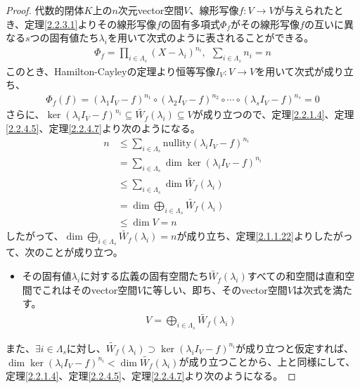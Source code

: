 \documentclass[dvipdfmx]{jsarticle}
\begin{document}
\begin{proof}
代数的閉体$K$上の$n$次元vector空間$V$、線形写像$f:V \rightarrow V$が与えられたとき、定理\ref{2.2.3.1}よりその線形写像$f$の固有多項式$\varPhi_{f}$がその線形写像$f$の互いに異なる$s$つの固有値たち$\lambda_{i}$を用いて次式のように表されることができる。
\begin{align*}
\varPhi_{f} = \prod_{i \in \varLambda_{s}} \left( X - \lambda_{i} \right)^{n_{i}},\ \ \sum_{i \in \varLambda_{s}} n_{i} = n
\end{align*}
このとき、Hamilton-Cayleyの定理より恒等写像$I_{V}:V \rightarrow V$を用いて次式が成り立ち、
\begin{align*}
\varPhi_{f}(f) = \left( \lambda_{1}I_{V} - f \right)^{n_{1}} \circ \left( \lambda_{2}I_{V} - f \right)^{n_{2}} \circ \cdots \circ \left( \lambda_{s}I_{V} - f \right)^{n_{s}} = 0
\end{align*}
さらに、$\ker\left( \lambda_{i}I_{V} - f \right)^{n_{i}} \subseteq \widetilde{W_{f}}\left( \lambda_{i} \right) \subseteq V$が成り立つので、定理\ref{2.2.1.4}、定理\ref{2.2.4.5}、定理\ref{2.2.4.7}より次のようになる。
\begin{align*}
n &\leq \sum_{i \in \varLambda_{s}} {{\mathrm{nullity}}\left( \lambda_{i}I_{V} - f \right)^{n_{i}}}\\
&= \sum_{i \in \varLambda_{s}} {\dim{\ker\left( \lambda_{i}I_{V} - f \right)^{n_{i}}}}\\
&\leq \sum_{i \in \varLambda_{s}} {\dim{\widetilde{W_{f}}\left( \lambda_{i} \right)}}\\
&= \dim{\bigoplus_{i \in \varLambda_{s}} {\widetilde{W_{f}}\left( \lambda_{i} \right)}}\\
&\leq \dim V = n
\end{align*}
したがって、$\dim{\bigoplus_{i \in \varLambda_{s}} {\widetilde{W_{f}}\left( \lambda_{i} \right)}} = n$が成り立ち、定理\ref{2.1.1.22}よりしたがって、次のことが成り立つ。
\begin{itemize}
\item
  その固有値$\lambda_{i}$に対する広義の固有空間たち$\widetilde{W_{f}}\left( \lambda_{i} \right)$すべての和空間は直和空間でこれはそのvector空間$V$に等しい、即ち、そのvector空間$V$は次式を満たす。
\begin{align*}
V = \bigoplus_{i \in \varLambda_{s}} {\widetilde{W_{f}}\left( \lambda_{i} \right)}
\end{align*}\par
\end{itemize}
また、$\exists i \in \varLambda_{s}$に対し、$\widetilde{W_{f}}\left( \lambda_{i} \right) \supset \ker\left( \lambda_{i}I_{V} - f \right)^{n_{i}}$が成り立つと仮定すれば、$\dim{\ker\left( \lambda_{i}I_{V} - f \right)^{n_{i}}} < \dim{\widetilde{W_{f}}\left( \lambda_{i} \right)}$が成り立つことから、上と同様にして、定理\ref{2.2.1.4}、定理\ref{2.2.4.5}、定理\ref{2.2.4.7}より次のようになる。

\end{proof}
\end{document}
